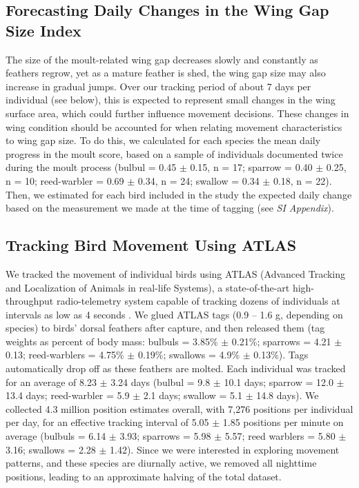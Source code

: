 \subsection*{Forecasting Daily Changes in the Wing Gap Size Index}

The size of the moult-related wing gap decreases slowly and constantly as feathers regrow, yet as a mature feather is shed, the wing gap size may also increase in gradual jumps.
Over our tracking period of about 7 days per individual (see below), this is expected to represent small changes in the wing surface area, which could further influence movement decisions.
These changes in wing condition should be accounted for when relating movement characteristics to wing gap size.
To do this, we calculated for each species the mean daily progress in the moult score, based on a sample of individuals documented twice during the moult process (bulbul = 0.45 $\pm$ 0.15, n = 17; sparrow = 0.40 $\pm$ 0.25, n = 10; reed-warbler = 0.69 $\pm$ 0.34, n = 24; swallow = 0.34 $\pm$ 0.18, n = 22). 
Then, we estimated for each bird included in the study the expected daily change based on the measurement we made at the time of tagging (see \textit{SI Appendix}).

\subsection*{Tracking Bird Movement Using ATLAS}

We tracked the movement of individual birds using ATLAS (Advanced Tracking and Localization of Animals in real-life Systems), a state-of-the-art high-throughput radio-telemetry system capable of tracking dozens of individuals at intervals as low as 4 seconds \citep{weiser2016,toledo2014,toledo2020,nathan2022}.
We glued ATLAS tags (0.9 -- 1.6 g, depending on species) to birds' dorsal feathers after capture, and then released them (tag weights as percent of body mass: bulbuls = 3.85\% $\pm$ 0.21\%; sparrows = 4.21 $\pm$ 0.13; reed-warblers = 4.75\% $\pm$ 0.19\%; swallows = 4.9\% $\pm$ 0.13\%).
Tags automatically drop off as these feathers are molted.
Each individual was tracked for an average of 8.23 $\pm$ 3.24 days (bulbul = 9.8 $\pm$ 10.1 days; sparrow = 12.0 $\pm$ 13.4 days; reed-warbler = 5.9 $\pm$ 2.1 days; swallow = 5.1 $\pm$ 14.8 days).
We collected 4.3 million position estimates overall, with 7,276 positions per individual per day, for an effective tracking interval of 5.05 $\pm$ 1.85 positions per minute on average (bulbuls = 6.14 $\pm$ 3.93; sparrows = 5.98 $\pm$ 5.57; reed warblers = 5.80 $\pm$ 3.16; swallows = 2.28 $\pm$ 1.42).
Since we were interested in exploring movement patterns, and these species are diurnally active, we removed all nighttime positions, leading to an approximate halving of the total dataset.

